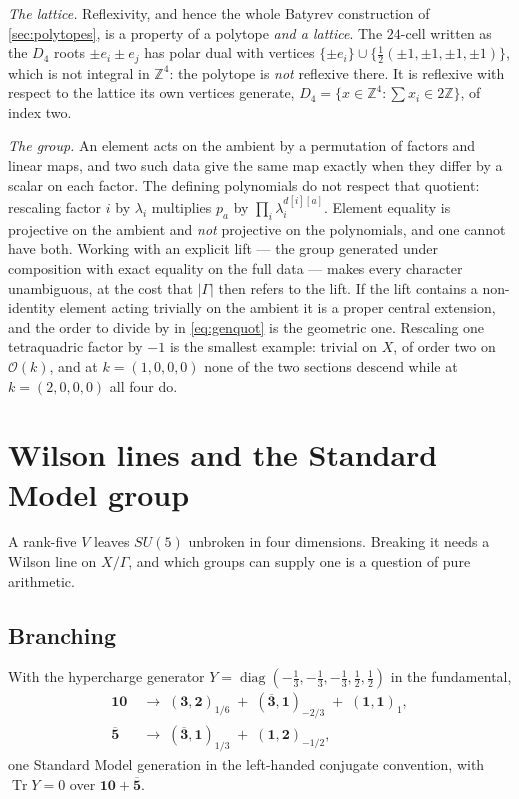 \documentclass[11pt,a4paper]{article}
\newcommand{\cO}{\mathcal{O}}
\theoremstyle{definition}
\begin{document}
\emph{The lattice.} Reflexivity, and hence the whole Batyrev construction of
\cref{sec:polytopes}, is a property of a polytope \emph{and a lattice}. The
$24$-cell written as the $D_4$ roots $\pm e_i \pm e_j$ has polar dual with
vertices $\{\pm e_i\} \cup \{\tfrac12(\pm1,\pm1,\pm1,\pm1)\}$, which is not
integral in $\mathbb{Z}^4$: the polytope is \emph{not} reflexive there. It is
reflexive with respect to the lattice its own vertices generate,
$D_4 = \{x \in \mathbb{Z}^4 : \sum x_i \in 2\mathbb{Z}\}$, of index two.

\emph{The group.} An element acts on the ambient by a permutation of factors
and linear maps, and two such data give the same map exactly when they differ
by a scalar on each factor. The defining polynomials do not respect that
quotient: rescaling factor $i$ by $\lambda_i$ multiplies $p_a$ by
$\prod_i \lambda_i^{d[i][a]}$. Element equality is projective on the ambient
and \emph{not} projective on the polynomials, and one cannot have both. Working
with an explicit lift --- the group generated under composition with exact
equality on the full data --- makes every character unambiguous, at the cost
that $|\Gamma|$ then refers to the lift. If the lift contains a non-identity
element acting trivially on the ambient it is a proper central extension, and
the order to divide by in \cref{eq:genquot} is the geometric one. Rescaling one
tetraquadric factor by $-1$ is the smallest example: trivial on $X$, of order
two on $\cO(k)$, and at $k = (1,0,0,0)$ none of the two sections descend while
at $k = (2,0,0,0)$ all four do.

\section{Wilson lines and the Standard Model group}
\label{sec:breaking}

A rank-five $V$ leaves $SU(5)$ unbroken in four dimensions. Breaking it needs a
Wilson line on $X/\Gamma$, and which groups can supply one is a question of
pure arithmetic.

\subsection{Branching}

With the hypercharge generator $Y = \operatorname{diag}(-\tfrac13,-\tfrac13,
-\tfrac13,\tfrac12,\tfrac12)$ in the fundamental,
%
\begin{align}
\mathbf{10} \;&\longrightarrow\;
(\mathbf{3},\mathbf{2})_{1/6}
\;+\; (\overline{\mathbf{3}},\mathbf{1})_{-2/3}
\;+\; (\mathbf{1},\mathbf{1})_{1} ,
\label{eq:ten}\\
\overline{\mathbf{5}} \;&\longrightarrow\;
(\overline{\mathbf{3}},\mathbf{1})_{1/3}
\;+\; (\mathbf{1},\mathbf{2})_{-1/2} ,
\label{eq:fivebar}
\end{align}
%
one Standard Model generation in the left-handed conjugate convention, with
$\operatorname{Tr} Y = 0$ over $\mathbf{10} + \overline{\mathbf{5}}$.
\end{document}
